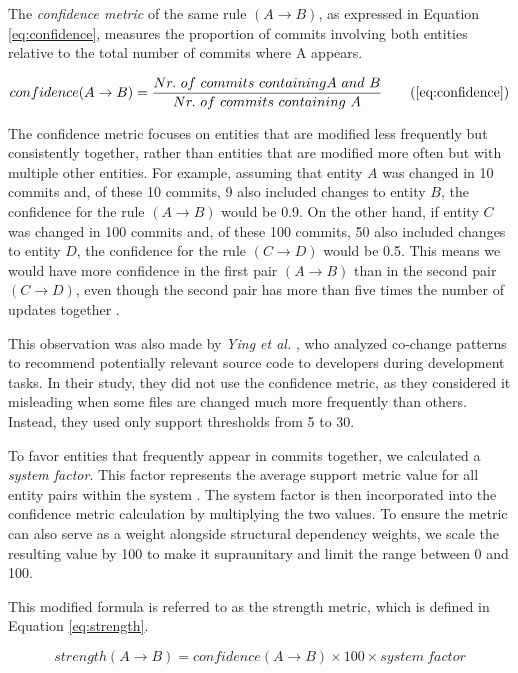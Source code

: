 The \textit{confidence metric} of the same rule $(A \rightarrow B)$, as expressed in Equation \eqref{eq:confidence}, measures the proportion of commits involving both entities relative to the total number of commits where A appears.

\[
\text{$confidence$}(A \rightarrow B) = \frac{\text{$Nr.\ of\ commits\ containing$} A \text{ $and$ } B}{\text{$Nr.\ of\ commits\ containing$ } A}
\tag{\ref{eq:confidence}}
\]



The confidence metric focuses on entities that are modified less frequently but consistently together, rather than entities that are modified more often but with multiple other entities. For example, assuming that entity \( A \) was changed in 10 commits and, of these 10 commits, 9 also included changes to entity \( B \), the confidence for the rule \( (A \rightarrow B) \) would be 0.9. On the other hand, if entity \( C \) was changed in 100 commits and, of these 100 commits, 50 also included changes to entity \( D \), the confidence for the rule \( (C \rightarrow D) \) would be 0.5. This means we would have more confidence in the first pair \( (A \rightarrow B) \) than in the second pair \( (C \rightarrow D) \), even though the second pair has more than five times the number of updates together \cite{cluster-access}.


This observation was also made by \textit{Ying et al.} \cite{Ying-co-change}, who analyzed co-change patterns to recommend potentially relevant source code to developers during development tasks. In their study, they did not use the confidence metric, as they considered it misleading when some files are changed much more frequently than others. Instead, they used only support thresholds from 5 to 30.
 

To favor entities that frequently appear in commits together, we calculated a \textit{system factor}. This factor represents the average support metric value for all entity pairs within the system \cite{cluster-access, b4}. The system factor is then incorporated into the confidence metric calculation by multiplying the two values. To ensure the metric can also serve as a weight alongside structural dependency weights, we scale the resulting value by 100 to make it supraunitary and limit the range between 0 and 100.

This modified formula is referred to as the strength metric, which is defined in Equation \eqref{eq:strength}.

\begin{equation}
\text{$strength$}(A \rightarrow B) = \text{$confidence$}(A \rightarrow B) \times 100 \times \text{$system\ factor$}
\label{eq:strength}
\end{equation}



